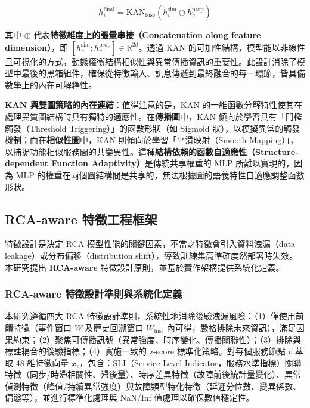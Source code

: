 \documentclass[10pt,a4paper,twocolumn]{article}
\begin{document}
\begin{equation}
h_v^{\text{final}} = \text{KAN}_{\text{fuse}}\left( h_v^{\text{sim}} \oplus h_v^{\text{prop}} \right)
\end{equation}

其中 $\oplus$ 代表\textbf{特徵維度上的張量串接（Concatenation along feature dimension）}，即 $[h_v^{\text{sim}}; h_v^{\text{prop}}] \in \mathbb{R}^{2d}$。透過 KAN 的可加性結構，模型能以非線性且可視化的方式，動態權衡結構相似性與異常傳播資訊的重要性。此設計消除了模型中最後的黑箱組件，確保從特徵輸入、訊息傳遞到最終融合的每一環節，皆具備數學上的內在可解釋性。

\textbf{KAN 與雙圖策略的內在連結}：值得注意的是，KAN 的一維函數分解特性使其在處理異質圖結構時具有獨特的適應性。在\textbf{傳播圖}中，KAN 傾向於學習具有「門檻觸發（Threshold Triggering）」的函數形狀（如 Sigmoid 狀），以模擬異常的觸發機制；而在\textbf{相似性圖}中，KAN 則傾向於學習「平滑映射（Smooth Mapping）」，以捕捉功能相似服務間的共變異性。這種\textbf{結構依賴的函數自適應性（Structure-dependent Function Adaptivity）}是傳統共享權重的 MLP 所難以實現的，因為 MLP 的權重在兩個圖結構間是共享的，無法根據圖的語義特性自適應調整函數形狀。

\subsection{RCA-aware 特徵工程框架}

特徵設計是決定 RCA 模型性能的關鍵因素，不當之特徵會引入資料洩漏（data leakage）或分布偏移（distribution shift），導致訓練集高準確度然部署時失效。本研究提出 \textbf{RCA-aware} 特徵設計原則，並基於實作架構提供系統化定義。

\subsubsection{RCA-aware 特徵設計準則與系統化定義}

本研究遵循四大 RCA 特徵設計準則，系統性地消除後驗洩漏風險：（1）僅使用前饋特徵（事件窗口 $W$ 及歷史回溯窗口 $W_{\text{hist}}$ 內可得，嚴格排除未來資訊），滿足因果約束；（2）聚焦可傳播訊號（異常強度、時序變化、傳播關聯性）；（3）排除與標註耦合的後驗指標；（4）實施一致的 z-score 標準化策略。對每個服務節點 $v$ 萃取 48 維特徵向量 $\bar{x}_v$，包含：SLI（Service Level Indicator，服務水準指標）關聯特徵（同步/時滯相關性、滯後量）、時序差異特徵（故障前後統計量變化）、異常偵測特徵（峰值/持續異常強度）與故障類型特化特徵（延遲分位數、變異係數、偏態等），並進行標準化處理與 NaN/Inf 值處理以確保數值穩定性。
\end{document}
